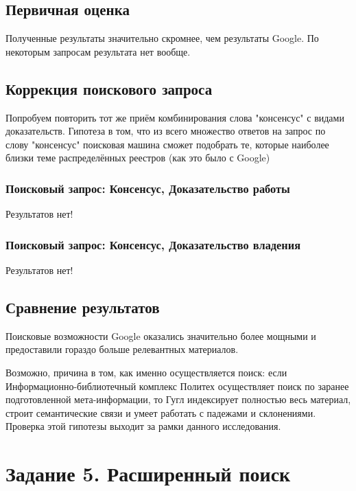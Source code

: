 \documentclass[a4paper, 12pt]{report}		%
\begin{document}
\section*{Первичная оценка}

Полученные результаты значительно скромнее, чем результаты Google. По некоторым запросам результата нет вообще.

\section*{Коррекция поискового запроса}

Попробуем повторить тот же приём комбинирования слова "консенсус" с видами доказательств. Гипотеза в том, что из всего множество ответов на запрос по слову "консенсус" поисковая машина сможет подобрать те, которые наиболее близки теме распределённых реестров (как это было с Google)

\subsection*{Поисковый запрос: Консенсус, Доказательство работы}

Результатов нет!

\subsection*{Поисковый запрос: Консенсус, Доказательство владения}

Результатов нет!

\section*{Сравнение результатов}

Поисковые возможности Google оказались значительно более мощными и предоставили гораздо больше релевантных материалов.

Возможно, причина в том, как именно осуществляется поиск: если Информационно-библиотечный комплекс Политех осуществляет поиск по заранее подготовленной мета-информации, то Гугл индексирует полностью весь материал, строит семантические связи и умеет работать с падежами и склонениями. Проверка этой гипотезы выходит за рамки данного исследования.

\chapter*{Задание 5. Расширенный поиск}
\end{document}
